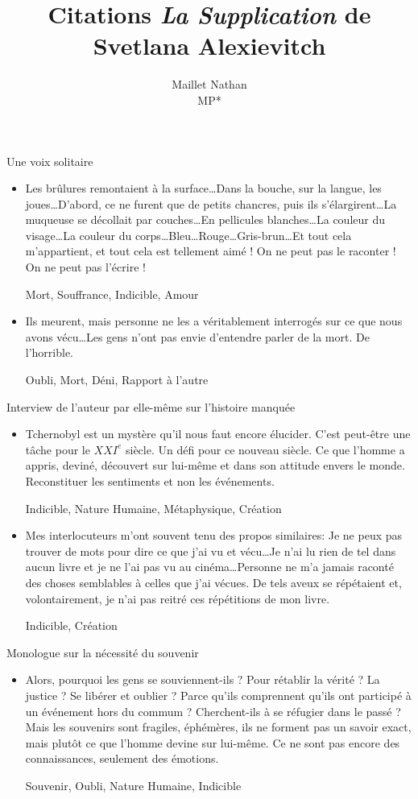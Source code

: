 \documentclass[french,a4paper,11pt,answers]{exam}
\title{Citations \emph{La Supplication} de Svetlana Alexievitch}
\author{Maillet Nathan\\MP*}
\date{}
\newcommand{\cit}[2]{\og #1 \fg{} \begin{solution}{ #2 }\end{solution}} %
\begin{document}
	\maketitle

	\begin{cadre}{Une voix solitaire}
		\begin{itemize}
			\item \cit {Les brûlures remontaient à la surface\ldots Dans la bouche, sur la langue, les joues\ldots D'abord, ce ne furent que de petits chancres, puis ils s'élargirent\ldots La muqueuse se décollait par couches\ldots En pellicules blanches\ldots La couleur du visage\ldots La couleur du corps\ldots Bleu\ldots Rouge\ldots Gris-brun\ldots Et tout cela m'appartient, et tout cela est tellement aimé ! On ne peut pas le raconter ! On ne peut pas l'écrire !} %
				{Mort, Souffrance, Indicible, Amour} %
			\item \cit {Ils meurent, mais personne ne les a véritablement interrogés sur ce que nous avons vécu\ldots Les gens n'ont pas envie d'entendre parler de la mort. De l'horrible.}
				{Oubli, Mort, Déni, Rapport à l'autre}
		\end{itemize}
	\end{cadre}
	
	\begin{cadre}{Interview de l'auteur par elle-même sur l'histoire manquée}
		\begin{itemize}
			\item \cit {Tchernobyl est un mystère qu'il nous faut encore élucider. C'est peut-être une tâche pour le $XXI^e$ siècle. Un défi pour ce nouveau siècle. Ce que l'homme a appris, deviné, découvert sur lui-même et dans son attitude envers le monde. Reconstituer les sentiments et non les événements.}
				{Indicible, Nature Humaine, Métaphysique, Création}
			\item \cit{Mes interlocuteurs m'ont souvent tenu des propos similaires: \og Je ne peux pas trouver de mots pour dire ce que j'ai vu et vécu\ldots Je n'ai lu rien de tel dans aucun livre et je ne l'ai pas vu au cinéma\ldots Personne ne m'a jamais raconté des choses semblables à celles que j'ai vécues. \fg{} De tels aveux se répétaient et, volontairement, je n'ai pas reitré ces répétitions de mon livre.}
				{Indicible, Création}
		\end{itemize}
	\end{cadre}
	
	\begin{cadre}{Monologue sur la nécessité du souvenir}
		\begin{itemize}
			\item \cit {Alors, pourquoi les gens se souviennent-ils ? Pour rétablir la vérité ? La justice ? Se libérer et oublier ? Parce qu'ils comprennent qu'ils ont participé à un événement hors du commum ? Cherchent-ils à se réfugier dans le passé ? Mais les souvenirs sont fragiles, éphémères, ils ne forment pas un savoir exact, mais plutôt ce que l'homme devine sur lui-même. Ce ne sont pas encore des connaissances, seulement des émotions.}
				{Souvenir, Oubli, Nature Humaine, Indicible}
		\end{itemize}
	\end{cadre}
	
\end{document}
